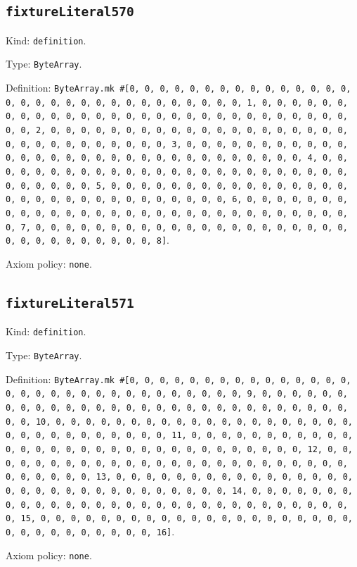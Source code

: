 \documentclass[11pt]{article}
\begin{document}
\subsection*{\texttt{fixtureLiteral570}}
\noindent Kind: \texttt{definition}.\par
\noindent Type: \texttt{ByteArray}.\par
\noindent Definition: \texttt{ByteArray.mk \#[0, 0, 0, 0, 0, 0, 0, 0, 0, 0, 0, 0, 0, 0, 0, 0, 0, 0, 0, 0, 0, 0, 0, 0, 0, 0, 0, 0, 0, 0, 0, 1, 0, 0, 0, 0, 0, 0, 0, 0, 0, 0, 0, 0, 0, 0, 0, 0, 0, 0, 0, 0, 0, 0, 0, 0, 0, 0, 0, 0, 0, 0, 0, 2, 0, 0, 0, 0, 0, 0, 0, 0, 0, 0, 0, 0, 0, 0, 0, 0, 0, 0, 0, 0, 0, 0, 0, 0, 0, 0, 0, 0, 0, 0, 0, 3, 0, 0, 0, 0, 0, 0, 0, 0, 0, 0, 0, 0, 0, 0, 0, 0, 0, 0, 0, 0, 0, 0, 0, 0, 0, 0, 0, 0, 0, 0, 0, 4, 0, 0, 0, 0, 0, 0, 0, 0, 0, 0, 0, 0, 0, 0, 0, 0, 0, 0, 0, 0, 0, 0, 0, 0, 0, 0, 0, 0, 0, 0, 0, 5, 0, 0, 0, 0, 0, 0, 0, 0, 0, 0, 0, 0, 0, 0, 0, 0, 0, 0, 0, 0, 0, 0, 0, 0, 0, 0, 0, 0, 0, 0, 0, 6, 0, 0, 0, 0, 0, 0, 0, 0, 0, 0, 0, 0, 0, 0, 0, 0, 0, 0, 0, 0, 0, 0, 0, 0, 0, 0, 0, 0, 0, 0, 0, 7, 0, 0, 0, 0, 0, 0, 0, 0, 0, 0, 0, 0, 0, 0, 0, 0, 0, 0, 0, 0, 0, 0, 0, 0, 0, 0, 0, 0, 0, 0, 0, 8]}.\par
\noindent Axiom policy: \texttt{none}.\par
\subsection*{\texttt{fixtureLiteral571}}
\noindent Kind: \texttt{definition}.\par
\noindent Type: \texttt{ByteArray}.\par
\noindent Definition: \texttt{ByteArray.mk \#[0, 0, 0, 0, 0, 0, 0, 0, 0, 0, 0, 0, 0, 0, 0, 0, 0, 0, 0, 0, 0, 0, 0, 0, 0, 0, 0, 0, 0, 0, 0, 9, 0, 0, 0, 0, 0, 0, 0, 0, 0, 0, 0, 0, 0, 0, 0, 0, 0, 0, 0, 0, 0, 0, 0, 0, 0, 0, 0, 0, 0, 0, 0, 10, 0, 0, 0, 0, 0, 0, 0, 0, 0, 0, 0, 0, 0, 0, 0, 0, 0, 0, 0, 0, 0, 0, 0, 0, 0, 0, 0, 0, 0, 0, 0, 11, 0, 0, 0, 0, 0, 0, 0, 0, 0, 0, 0, 0, 0, 0, 0, 0, 0, 0, 0, 0, 0, 0, 0, 0, 0, 0, 0, 0, 0, 0, 0, 12, 0, 0, 0, 0, 0, 0, 0, 0, 0, 0, 0, 0, 0, 0, 0, 0, 0, 0, 0, 0, 0, 0, 0, 0, 0, 0, 0, 0, 0, 0, 0, 13, 0, 0, 0, 0, 0, 0, 0, 0, 0, 0, 0, 0, 0, 0, 0, 0, 0, 0, 0, 0, 0, 0, 0, 0, 0, 0, 0, 0, 0, 0, 0, 14, 0, 0, 0, 0, 0, 0, 0, 0, 0, 0, 0, 0, 0, 0, 0, 0, 0, 0, 0, 0, 0, 0, 0, 0, 0, 0, 0, 0, 0, 0, 0, 15, 0, 0, 0, 0, 0, 0, 0, 0, 0, 0, 0, 0, 0, 0, 0, 0, 0, 0, 0, 0, 0, 0, 0, 0, 0, 0, 0, 0, 0, 0, 0, 16]}.\par
\noindent Axiom policy: \texttt{none}.\par
\end{document}

